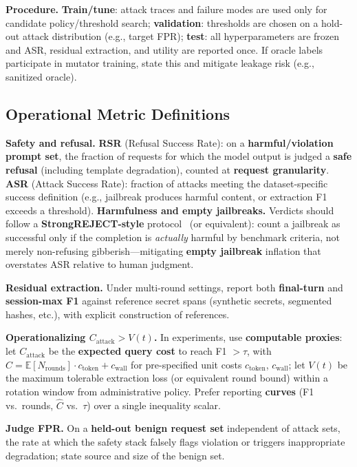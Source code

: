 \documentclass[letterpaper,twocolumn,10pt]{article}
\begin{document}
\textbf{Procedure.} \textbf{Train/tune}: attack traces and failure modes are used only for candidate policy/threshold search; \textbf{validation}: thresholds are chosen on a hold-out attack distribution (e.g., target FPR); \textbf{test}: all hyperparameters are frozen and ASR, residual extraction, and utility are reported once. If oracle labels participate in mutator training, state this and mitigate leakage risk (e.g., sanitized oracle).

\subsection{Operational Metric Definitions}
\label{sec:eval-metrics}

\textbf{Safety and refusal.} \textbf{RSR} (Refusal Success Rate): on a \textbf{harmful/violation prompt set}, the fraction of requests for which the model output is judged a \textbf{safe refusal} (including template degradation), counted at \textbf{request granularity}. \textbf{ASR} (Attack Success Rate): fraction of attacks meeting the dataset-specific success definition (e.g., jailbreak produces harmful content, or extraction F1 exceeds a threshold). \textbf{Harmfulness and empty jailbreaks.} Verdicts should follow a \textbf{StrongREJECT-style} protocol~\cite{strongreject} (or equivalent): count a jailbreak as successful only if the completion is \emph{actually} harmful by benchmark criteria, not merely non-refusing gibberish---mitigating \textbf{empty jailbreak} inflation that overstates ASR relative to human judgment.

\textbf{Residual extraction.} Under multi-round settings, report both \textbf{final-turn} and \textbf{session-max F1} against reference secret spans (synthetic secrets, segmented hashes, etc.), with explicit construction of references.

\textbf{Operationalizing $C_{\mathrm{attack}} > V(t)$.} In experiments, use \textbf{computable proxies}: let $C_{\mathrm{attack}}$ be the \textbf{expected query cost} to reach F1 $>\tau$, with $\hat{C} = \mathbb{E}[N_{\mathrm{rounds}}] \cdot c_{\mathrm{token}} + c_{\mathrm{wall}}$ for pre-specified unit costs $c_{\mathrm{token}}$, $c_{\mathrm{wall}}$; let $V(t)$ be the maximum tolerable extraction loss (or equivalent round bound) within a rotation window from administrative policy. Prefer reporting \textbf{curves} (F1 vs.\ rounds, $\hat{C}$ vs.\ $\tau$) over a single inequality scalar.

\textbf{Judge FPR.} On a \textbf{held-out benign request set} independent of attack sets, the rate at which the safety stack falsely flags violation or triggers inappropriate degradation; state source and size of the benign set.
\end{document}
